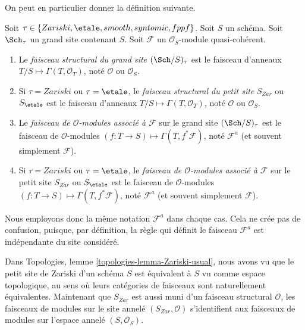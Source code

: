 \noindent
On peut en particulier donner la définition suivante.

\begin{definition}
\label{definition-structure-sheaf}
Soit $\tau \in \{Zariski, \linebreak[0] \etale, \linebreak[0]
smooth, \linebreak[0] syntomic, \linebreak[0] fppf\}$.
Soit $S$ un schéma.
Soit $\Sch_\tau$ un grand site contenant $S$.
Soit $\mathcal{F}$ un $\mathcal{O}_S$-module quasi-cohérent.
\begin{enumerate}
\item Le {\it faisceau structural du grand site $(\Sch/S)_\tau$}
est le faisceau d'anneaux $T/S \mapsto \Gamma(T, \mathcal{O}_T)$, noté
$\mathcal{O}$ ou $\mathcal{O}_S$.
\item Si $\tau = Zariski$ ou $\tau = \etale$, le
{\it faisceau structural du petit site} $S_{Zar}$ ou $S_\etale$
est le faisceau d'anneaux $T/S \mapsto \Gamma(T, \mathcal{O}_T)$,
noté $\mathcal{O}$ ou $\mathcal{O}_S$.
\item Le {\it faisceau de $\mathcal{O}$-modules associé à
$\mathcal{F}$} sur le grand site $(\Sch/S)_\tau$
est le faisceau de $\mathcal{O}$-modules
$(f : T \to S) \mapsto \Gamma(T, f^*\mathcal{F})$,
noté $\mathcal{F}^a$ (et souvent simplement $\mathcal{F}$).
\item Si $\tau = Zariski$ ou $\tau = \etale$, le
{\it faisceau de $\mathcal{O}$-modules associé à $\mathcal{F}$}
sur le petit site $S_{Zar}$ ou $S_\etale$ est le faisceau de
$\mathcal{O}$-modules $(f : T \to S) \mapsto \Gamma(T, f^*\mathcal{F})$,
noté $\mathcal{F}^a$ (et souvent simplement $\mathcal{F}$).
\end{enumerate}
\end{definition}

\noindent
Nous employons donc la même notation $\mathcal{F}^a$ dans chaque cas.
Cela ne crée pas de confusion, puisque, par définition, la règle
qui définit le faisceau $\mathcal{F}^a$ est indépendante du site
considéré.

\begin{remark}
\label{remark-Zariski-site-space}
Dans Topologies, lemme \ref{topologies-lemma-Zariski-usual},
nous avons vu que le petit site de Zariski d'un schéma $S$ est
équivalent à $S$ vu comme espace topologique, au sens où leurs
catégories de faisceaux sont naturellement équivalentes. Maintenant que $S_{Zar}$
est aussi muni d'un faisceau structural $\mathcal{O}$, les
faisceaux de modules sur le site annelé $(S_{Zar}, \mathcal{O})$
s'identifient aux faisceaux de modules sur l'espace annelé $(S, \mathcal{O}_S)$.
\end{remark}

